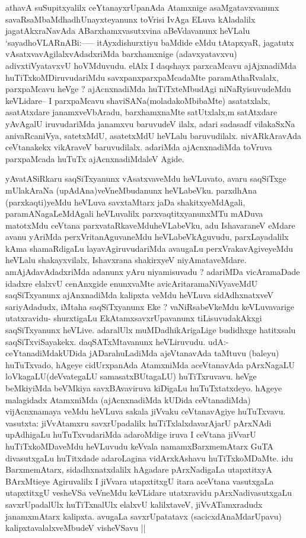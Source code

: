 \begin{artha}
athavA suSupitxyalilx ceYtanayxrUpanAda Atamxnige asaMgatavxvanunx
savaRsaMbaMdhadhUnayxteyanunx toVrisi IvAga ELuva kAladalilx
jagatAkxraNavAda ABarxhamxvasutxvina aBeVdavanunx heVLalu
`sayadhoVLARnABi:----- itAyxdishurxtiyu baMdide eMdu tAtapxyaR,
jagatutx vAsatxvavAgilalxvAdadxriMda barxhamxnige (adavxyatavxvu)
adivxtiVyatavxvU hoVMduvudu. elAlx I daqshayx parxcaMcavu ajAjxnadiMda
huTiTxkoMDiruvudariMdu savxpanxparxpaMcadaMte paramAthaRvalalx,
parxpaMcavu heVge ? ajAcnxnadiMda huTiTxteMbudAgi niNaRyisuvudeMdu
keVLidare-- I parxpaMcavu shaviSANa(moladakoMbibaMte) asatatxlalx,
asatAtxdare janamxveVbAradu, barxhamxnaMte satUtxlalx,m satAtxdare
yAvAgalU iruvudariMda janamxvu baruvudeV ilalx, adari sadasadf
vilakaSxNa anivaRcaniVya, satetxMdU, asatetxMdU heVLalu
baruvudilalx. nivARkAravAda ceVtanakekx vikAraveV
baruvudilalx. adariMda ajAcnxnadiMda toVruva parxpaMcada huTuTx
ajAcnxnadiMdaleV Agide.
\end{artha}

\begin{artha}
yAvatASiRkaru saqSiTxyanunx vAsatxvaveMdu heVLuvato, avaru saqSiTxge
mUlakAraNa (upAdAna)veVneMbudanunx heVLabeVku. parxdhAna
(parxkaqti)yeMdu heVLuva savxtaMtarx jaDa shakitxyeMdAgali,
paramANagaLeMdAgali heVLuvalilx parxvaqtitxyanunxMTu mADuva matotxMdu
ceVtana parxvataRkaveMduheVLabeVku, adu IshavaraneV eMdare avanu
yAriMda perxVritanAguvaneMdu heVLabeVkAguvudu, parxLayadalilx kAma
shamaRdigaLu layavAgiruvudariMda avaugaLu perxVrakavAgiveyeMdu heVLalu
shakayxvilalx, Ishavxrana shakirxyeV
niyAmataveMdare. amAjAdavAdadxriMda adanunx yAru niyamisuvadu ?
adariMDa vicAramaDade idadxre elalxvU cenAnxgide enunxvaMte
avicAritaramaNiVyaveMdU saqSiTxyanunx ajAnxnadiMda kalipxta veMdu
heVLuva sidAdhxnatxveV sariyAdadudx, iMtaha saqSiTxyanunx Eke ?
vaNiRsabeVkeMdu keVLuvavarige utatxravidu- shurxtigaLu
EkAtamxsavxrUpavanunx tiLisuvudakAkxgi saqSiTxyanunx
heVLive. adaralUlx muMDadhikArigaLige budidhxge hatitxsalu
saqSiTxviSayakekx. daqSATxMtavanunx heVLiruvudu. udA:-
ceYtanadiMdakUDida jADarahuLadiMda ajeVtanavAda taMtuvu (baleyu)
huTuTxvado, hAgeye cidUrxpanAda AtamxniMda aceVtanavAda pArxNagaLU
loVkagaLU(deVvategaLU samasatxBUtagaLU) huTiTxruvavu. heVge beMkiyiMda
beVMkiya savxBAvaviruva kiDigaLu huTuTxtatxdeyo. hAgeye malagidadx
AtamxniMda (ajAcnxnadiMda kUDida ceVtanadiMda) vijAcnxnamaya veMdu
heVLuva sakala jiVvaku ceVtanavAgiye huTuTxvavu. vasutxta: jiVvAtamxru
savxrUpadalilx huTiTxlalxdavarAjarU pArxNAdi upAdhigaLu
huTuTxvudariMda adaroMdige iruva I ceVtana jiVvarU huTiTxkoMDaveMdu
heVLuvudu keVvala namamxBarxmemAtarx GuTA divasutxgaLu huTitxdade
adaroLagina vidArxkAshavu huTiTxkoMDaMte. idu BarxmemAtarx,
sidadhxnatxdalilx hAgadare pArxNadigaLa utapxtitxyA BArxMtieye
Agiruvalilx I jiVvara utapxtitxgU itara aceVtana vasutxgaLa
utapxtitxgU vesheVSa veVneMdu keVLidare utatxravidu pArxNadivasutxgaLu
savxrUpadalUlx huTiTxnalUlx elalxvU kalilxtaveV, jiVvATamxradudx
janamxmAtarx kalipxta. avugaLa savxrUpatatavx (sacicxdAnaMdarUpavu)
kalipxtavalalxveMbudeV visheVSavu ||
\end{artha}


